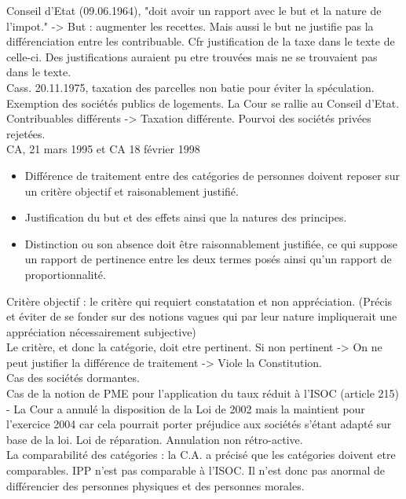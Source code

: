 \documentclass{book}
\begin{document}
Conseil d'Etat (09.06.1964), "doit avoir un rapport avec le but et la nature de l'impot." -> But : augmenter les recettes. Mais aussi le but ne justifie pas la différenciation entre les contribuable. Cfr justification de la taxe dans le texte de celle-ci. Des justifications auraient pu etre trouvées mais ne se trouvaient pas dans le texte.\\

Cass. 20.11.1975, taxation des parcelles non batie pour éviter la spéculation.  Exemption des sociétés publics de logements. La Cour se rallie au Conseil d'Etat. Contribuables différents -> Taxation différente. Pourvoi des sociétés privées rejetées.\\

CA, 21 mars 1995 et CA 18 février 1998\\
\begin{itemize}
\item Différence de traitement entre des catégories de personnes doivent reposer sur un critère objectif et raisonablement justifié.
\item Justification du but et des effets ainsi que la natures des principes.
\item Distinction ou son absence doit être raisonnablement justifiée, ce qui suppose un rapport de pertinence entre les deux termes posés ainsi qu'un rapport de proportionnalité.
\end{itemize}
\null

Critère objectif : le critère qui requiert constatation et non appréciation. (Précis et éviter de se fonder sur des notions vagues qui par leur nature impliquerait une appréciation nécessairement subjective)\\

Le critère, et donc la catégorie, doit etre pertinent. Si non pertinent -> On ne peut justifier la différence de traitement -> Viole la Constitution.\\

Cas des sociétés dormantes.\\

Cas de la notion de PME pour l'application du taux réduit à l'ISOC (article 215) - La Cour a annulé la disposition de la Loi de 2002 mais la maintient pour l'exercice 2004 car cela pourrait porter préjudice aux sociétés s'étant adapté sur base de la loi. Loi de réparation. Annulation non rétro-active.\\

La comparabilité des catégories : la C.A. a précisé que les catégories doivent etre comparables. IPP n'est pas comparable à l'ISOC. Il n'est donc pas anormal de différencier des personnes physiques et des personnes morales.\\
\end{document}
